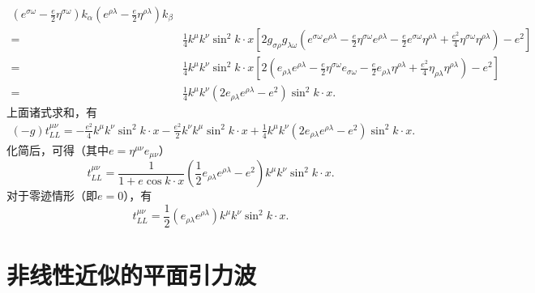\begin{align*}
	\left(e^{\sigma \omega}-\frac{e}{2}\eta^{\sigma \omega}\right) k_\alpha 
	\left(e^{\rho \lambda}-\frac{e}{2}\eta^{\rho \lambda}\right) k_\beta \\
	=&\frac{1}{4}k^\mu  k^\nu  \sin^2 k\cdot x \left[
	2g_{\sigma \rho}g_{\lambda \omega}
	\left(e^{\sigma \omega}e^{\rho \lambda}-\frac{e}{2}\eta^{\sigma \omega}e^{\rho \lambda}
	-\frac{e}{2}e^{\sigma \omega}\eta^{\rho \lambda} +\frac{e^2}{4}\eta^{\sigma \omega}\eta^{\rho \lambda}\right) 
	-e^2	\right] \\
	=&\frac{1}{4}k^\mu  k^\nu  \sin^2 k\cdot x \left[
	2\left(e_{\rho \lambda}e^{\rho \lambda}-\frac{e}{2}\eta^{\sigma \omega}e_{\sigma \omega}
	-\frac{e}{2}e_{\rho \lambda}\eta^{\rho \lambda} +\frac{e^2}{4}\eta_{\rho \lambda}\eta^{\rho \lambda}\right) 
	-e^2	\right] \\
	=&\frac{1}{4}k^\mu  k^\nu  \left(2e_{\rho \lambda}e^{\rho \lambda}	-e^2	\right) \sin^2 k\cdot x.
\end{align*}
上面诸式求和，有
\begin{align*}
	(-g)t_{LL}^{\mu \nu} = -\frac{e^2}{4} k^{\mu} k^{\nu}\sin^2 k\cdot x
	 -\frac{e^2}{2} k^{\nu} k^\mu \sin^2 k\cdot x
	 +\frac{1}{4}k^\mu  k^\nu  \left(2e_{\rho \lambda}e^{\rho \lambda}
	 	-e^2	\right) \sin^2 k\cdot x .
\end{align*}
化简后，可得（其中$e=\eta^{\mu\nu}e_{\mu\nu}$）
\begin{equation}\label{chle:eqn_tLL-plane}
	t_{LL}^{\mu \nu} = \frac{1}{1+e \cos k\cdot x}
	\left( \frac{1}{2} e_{\rho \lambda}e^{\rho \lambda}
	- e^2	 \right) k^\mu  k^\nu \sin^2 k\cdot x .
\end{equation}
对于零迹情形（即$e=0$），有
\begin{equation}\label{chle:eqn_tLL-plane-e0}
	t_{LL}^{\mu \nu} = 	\frac{1}{2} (e_{\rho \lambda}e^{\rho \lambda})
	 k^\mu  k^\nu \sin^2 k\cdot x .
\end{equation}


\section{非线性近似的平面引力波}

